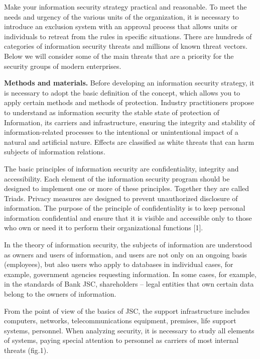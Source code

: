 \begin{multicols}{2}
Make your information security strategy practical and reasonable. To
meet the needs and urgency of the various units of the organization, it
is necessary to introduce an exclusion system with an approval process
that allows units or individuals to retreat from the rules in specific
situations. There are hundreds of categories of information security
threats and millions of known threat vectors. Below we will consider
some of the main threats that are a priority for the security groups of
modern enterprises.

{\bfseries Methods and materials.} Before developing an information
security strategy, it is necessary to adopt the basic definition of the
concept, which allows you to apply certain methods and methods of
protection. Industry practitioners propose to understand as information
security the stable state of protection of Information, its carriers and
infrastructure, ensuring the integrity and stability of
information-related processes to the intentional or unintentional impact
of a natural and artificial nature. Effects are classified as white
threats that can harm subjects of information relations.

The basic principles of information security are confidentiality,
integrity and accessibility. Each element of the information security
program should be designed to implement one or more of these principles.
Together they are called Triads. Privacy measures are designed to
prevent unauthorized disclosure of information. The purpose of the
principle of confidentiality is to keep personal information
confidential and ensure that it is visible and accessible only to those
who own or need it to perform their organizational functions {[}1{]}.

In the theory of information security, the subjects of information are
understood as owners and users of information, and users are not only on
an ongoing basis (employees), but also users who apply to databases in
individual cases, for example, government agencies requesting
information. In some cases, for example, in the standards of Bank JSC,
shareholders -- legal entities that own certain data belong to the
owners of information.

From the point of view of the basics of JSC, the support infrastructure
includes computers, networks, telecommunications equipment, premises,
life support systems, personnel. When analyzing security, it is
necessary to study all elements of systems, paying special attention to
personnel as carriers of most internal threats (fig.1).
\end{multicols}

